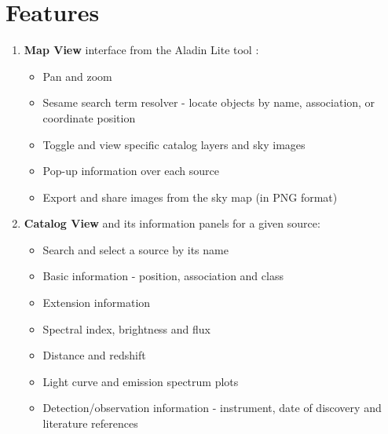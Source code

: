 \renewcommand{\thefootnote}{\fnsymbol{footnote}}

\section{Features}

\begin{enumerate}

\item \textbf{Map View} interface from the Aladin Lite tool \cite{aladin-lite}:

\begin{itemize}
\item Pan and zoom
\item Sesame search term resolver - locate objects by name, association, or coordinate position
\item Toggle and view specific catalog layers and sky images
\item Pop-up information over each source
\item Export and share images from the sky map (in PNG format)
\end{itemize}

\item \textbf{Catalog View} and its information panels for a given source:

\begin{itemize}

\item Search and select a source by its name
\item Basic information - position, association and class
\item Extension information
\item Spectral index, brightness and flux
\item Distance and redshift
\item Light curve and emission spectrum plots
\item Detection/observation information - instrument, date of discovery and literature references

\end{itemize}

\end{enumerate}
